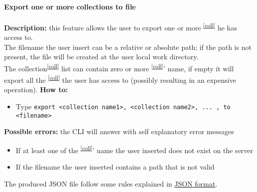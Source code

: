 \documentclass{scalatekids-article}
\begin{document}
\paragraph{Export one or more collections to file}
\label{sec:export}
\textbf{Description:} this feature allows the user to export one or more \textsuperscript{\ref{coll}} he has access to.\\
The filename the user insert can be a relative or absolute path; if the path is not present, the file will be created at the user local work directory.\\
The collection\textsuperscript{\ref{coll}} list can contain zero or more \textsuperscript{\ref{coll}}' name, if empty it will export all the \textsuperscript{\ref{coll}} the user has access to (possibly resulting in an expensive operation).
\textbf{How to:}
\begin{itemize}
\item Type \texttt{export <collection name1>, <collection name2>, ... , to <filename>}
\end{itemize}
\textbf{Possible errors:} the CLI will answer with self explanatory error messages
\begin{itemize}
\item If at least one of the \textsuperscript{\ref{coll}}' name the user inserted does not exist on the server
\item If the filename the user inserted contains a path that is not valid
\end{itemize}

The produced JSON file follow some rules explained in \hyperref[sec:JSONFormat]{JSON format}.
\end{document}
